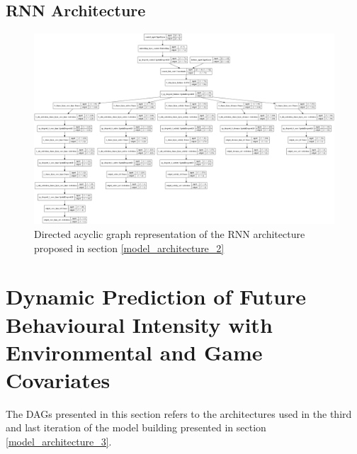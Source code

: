 \subsection{RNN Architecture}

\begin{figure}[H]
\centering
\includegraphics[width=\textwidth,height=\textheight,keepaspectratio]{images/appendix_B/rnn_2.png}
\caption[\textbf{RNN DAG  - Section \ref{model_architecture_2}}]{Directed acyclic graph representation of the RNN architecture proposed in section \ref{model_architecture_2}}
\label{rnn_2_dag}
\end{figure}

\section{Dynamic Prediction of Future Behavioural Intensity with Environmental and Game Covariates}
The DAGs presented in this section refers to the architectures used in the third and last iteration of the model building  presented in section \ref{model_architecture_3}. 

